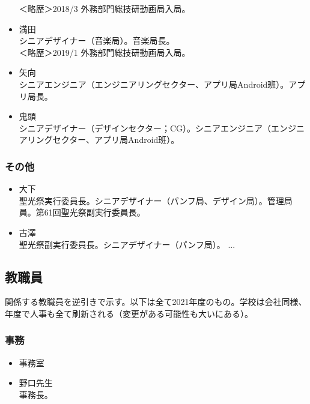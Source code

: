 \documentclass[dvipdfmx,jb5]{jarticle}
\begin{document}
\begin{itemize}
  ＜略歴＞2018/3 外務部門総技研動画局入局。
  \item 満田\\
  シニアデザイナー（音楽局）。音楽局長。\\
  ＜略歴＞2019/1 外務部門総技研動画局入局。
  \item 矢向\\
  シニアエンジニア（エンジニアリングセクター、アプリ局Android班）。アプリ局長。
  \item 鬼頭\\
  シニアデザイナー（デザインセクター；CG）。シニアエンジニア（エンジニアリングセクター、アプリ局Android班）。
\end{itemize}
\subsubsection{その他}
\begin{itemize}
  \item 大下\\
  聖光祭実行委員長。シニアデザイナー（パンフ局、デザイン局）。管理局員。第61回聖光祭副実行委員長。
  \item 古澤\\
  聖光祭副実行委員長。シニアデザイナー（パンフ局）。
  ...
\end{itemize}
\subsection{教職員}
関係する教職員を逆引きで示す。以下は全て2021年度のもの。学校は会社同様、年度で人事も全て刷新される（変更がある可能性も大いにある）。
\subsubsection{事務}
\begin{itemize}
  \item 事務室\\
  \item 野口先生\\
  事務長。
\end{itemize}
\end{document}
